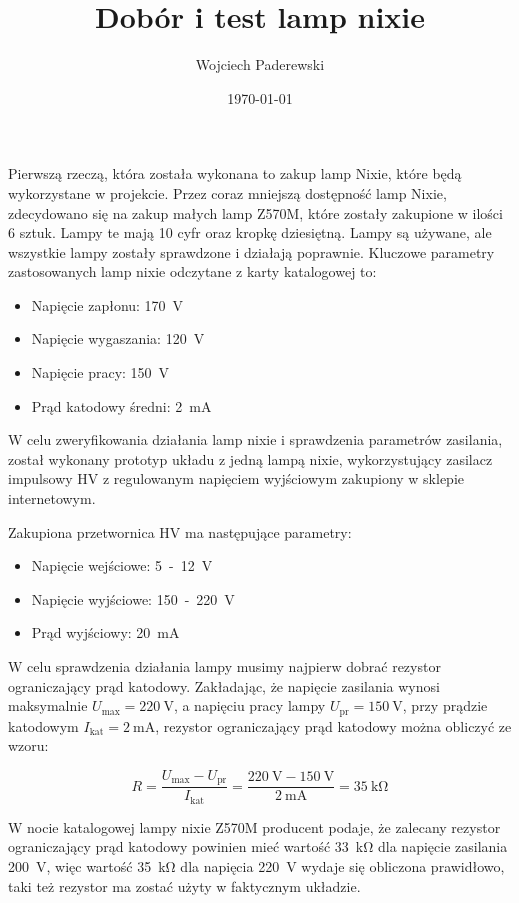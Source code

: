 \documentclass[../main.tex]{subfiles}
\author{Wojciech Paderewski}
\date{\today}
\title{Dobór i test lamp nixie}
\begin{document}
Pierwszą rzeczą, która została wykonana to zakup lamp Nixie, które będą wykorzystane w projekcie. 
Przez coraz mniejszą dostępność lamp Nixie,
zdecydowano się na zakup małych lamp Z570M, które zostały zakupione w ilości 6 sztuk. Lampy te mają 10 cyfr oraz kropkę dziesiętną.
Lampy są używane, ale wszystkie lampy zostały sprawdzone i działają poprawnie.
Kluczowe parametry zastosowanych lamp nixie odczytane z karty katalogowej\cite{st:Z5730M} to:
\begin{itemize}
    \item Napięcie zapłonu: \SI{170}{\volt}
    \item Napięcie wygaszania: \SI{120}{\volt}
    \item Napięcie pracy: \SI{150}{\volt}
    \item Prąd katodowy średni: \SI{2}{\milli\ampere}
\end{itemize}

W celu zweryfikowania działania lamp nixie i sprawdzenia parametrów zasilania, został wykonany prototyp układu z jedną lampą nixie,
wykorzystujący zasilacz impulsowy HV z regulowanym napięciem wyjściowym zakupiony w sklepie internetowym.

Zakupiona przetwornica HV ma następujące parametry:
\begin{itemize}
    \item Napięcie wejściowe: \SI{5}-\SI{12}{\volt}
    \item Napięcie wyjściowe: \SI{150}-\SI{220}{\volt}
    \item Prąd wyjściowy: \SI{20}{\milli\ampere}
\end{itemize}

W celu sprawdzenia działania lampy musimy najpierw dobrać rezystor ograniczający prąd katodowy.
Zakładając, że napięcie zasilania wynosi maksymalnie $U_{\text{max}} = \SI{220}{\volt}$, a napięciu pracy lampy $U_{\text{pr}} = \SI{150}{\volt}$,
przy prądzie katodowym $I_{\text{kat}} = \SI{2}{\milli\ampere}$, rezystor ograniczający prąd katodowy można obliczyć ze wzoru:

\begin{equation}
    R = \frac{U_{\text{max}} - U_{\text{pr}}}{I_{\text{kat}}} = \frac{\SI{220}{\volt} - \SI{150}{\volt}}{\SI{2}{\milli\ampere}} = \SI{35}{\kilo\ohm}
\end{equation}

W nocie katalogowej lampy nixie Z570M producent podaje, że zalecany rezystor ograniczający prąd katodowy 
powinien mieć wartość \SI{33}{\kilo\ohm} dla napięcie zasilania \SI{200}{\volt}, więc wartość \SI{35}{\kilo\ohm} dla napięcia \SI{220}{\volt}
wydaje się obliczona prawidłowo, taki też rezystor ma zostać użyty w faktycznym układzie.
\end{document}
